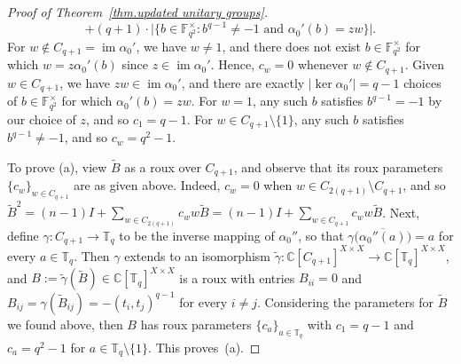 \documentclass[11pt]{article}
\theoremstyle{definition}
\numberwithin{equation}{section}
\begin{document}
\begin{proof}[Proof of Theorem~\ref{thm.updated unitary groups}]
\[+(q+1)\cdot \Big|\Big\{b\in\mathbb{F}_{q^2}^\times:b^{q-1}\neq-1\text{ and }\alpha_0'(b)=zw\Big\}\Big|.
\]
For $w\not\in C_{q+1}=\operatorname{im}\alpha_0'$, we have $w\neq 1$, and there does not exist $b\in\mathbb{F}_{q^2}^\times$ for which $w=z\alpha_0'(b)$ since $z\in\operatorname{im}\alpha_0'$.
Hence, $c_w=0$ whenever $w\not\in C_{q+1}$.
Given $w\in C_{q+1}$, we have $zw\in\operatorname{im}\alpha_0'$, and there are exactly $|\operatorname{ker}\alpha_0'|=q-1$ choices of $b\in\mathbb{F}_{q^2}^\times$ for which $\alpha_0'(b)=zw$.
For $w=1$, any such $b$ satisfies $b^{q-1} = -1$ by our choice of $z$, and so
$c_1 = q-1$.
For $w \in C_{q+1} \setminus \{1\}$, any such $b$ satisfies $b^{q-1}\neq-1$, and so $c_w =q^2-1$.

To prove (a), view $\tilde{B}$ as a roux over $C_{q+1}$, and observe that its roux parameters~$\{c_w\}_{w\in C_{q+1}}$ are as given above.
Indeed, $c_w = 0$ when $w \in C_{2(q+1)}\setminus C_{q+1}$, and so $\tilde{B}^2 = (n-1) I + \sum_{w\in C_{2(q+1)}} c_w w \tilde{B} = (n-1) I + \sum_{w\in C_{q+1}} c_w w \tilde{B}$.
Next, define $\gamma \colon C_{q+1} \to \mathbb{T}_q$ to be the inverse mapping of $\alpha_0''$, so that $\gamma\bigl( \overline{\alpha_0''(a)} \bigr) = a$ for every $a \in \mathbb{T}_q$.
Then $\gamma$ extends to an isomorphism $\tilde{\gamma} \colon \mathbb{C}[C_{q+1}]^{X \times X} \to \mathbb{C}[\mathbb{T}_q]^{X\times X}$, and $B:= \tilde{\gamma}(\tilde{B}) \in \mathbb{C}[\mathbb{T}_q]^{X\times X}$ is a roux with entries $B_{ii} = 0$ and $B_{ij} = \gamma( \tilde{B}_{ij} ) = - (t_i,t_j)^{q-1}$ for every $i \neq j$.
Considering the parameters for $\tilde{B}$ we found above, then $B$ has roux parameters $\{ c_a \}_{a\in \mathbb{T}_q}$ with $c_1 = q-1$ and $c_a = q^2 - 1$ for $a \in \mathbb{T}_q \setminus \{1\}$.
This proves~(a).


\end{proof}
\end{document}
